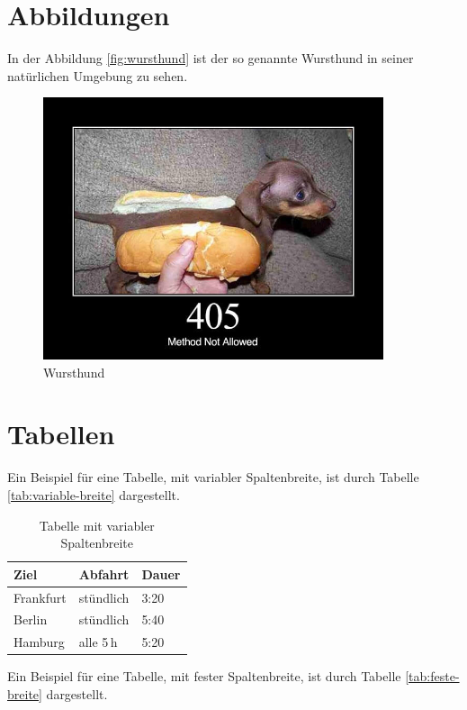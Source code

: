 \section{Abbildungen}

In der Abbildung \vref{fig:wursthund} ist der so genannte Wursthund in seiner natürlichen Umgebung zu sehen.

\begin{figure}[htbp]
	\centering
	\includegraphics[width=10cm]{bilder/wursthund.jpg}
	\caption{Wursthund}
	\label{fig:wursthund}
\end{figure}

\section{Tabellen}

Ein Beispiel für eine Tabelle, mit variabler Spaltenbreite, ist durch Tabelle \vref{tab:variable-breite} dargestellt.

\begin{table}[htbp]
\centering
\begin{tabular}{l l l}
\toprule
Ziel            & Abfahrt      & Dauer \\
\midrule
Frankfurt       & stündlich    & 3:20 \\
Berlin          & stündlich    & 5:40 \\
Hamburg         & alle 5\,h    & 5:20 \\
\bottomrule
\end{tabular}
\caption{Tabelle mit variabler Spaltenbreite}
\label{tab:variable-breite}
\end{table}

Ein Beispiel für eine Tabelle, mit fester Spaltenbreite, ist durch Tabelle \vref{tab:feste-breite} dargestellt.

